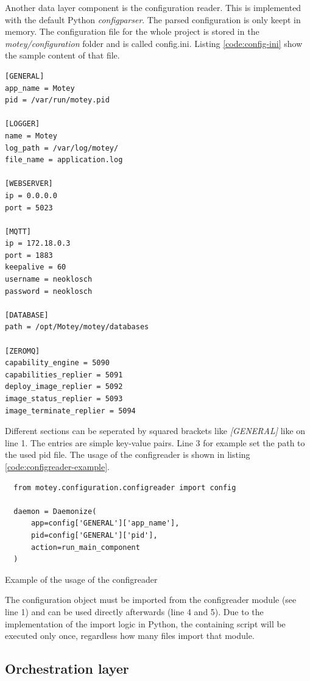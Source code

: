 Another data layer component is the configuration reader.
This is implemented with the default Python \textit{configparser}.
The parsed configuration is only keept in memory.
The configuration file for the whole project is stored in the \textit{motey/configuration} folder and is called config.ini.
Listing \ref{code:config-ini} show the sample content of that file.
\begin{verbatim}
[GENERAL]
app_name = Motey
pid = /var/run/motey.pid

[LOGGER]
name = Motey
log_path = /var/log/motey/
file_name = application.log

[WEBSERVER]
ip = 0.0.0.0
port = 5023

[MQTT]
ip = 172.18.0.3
port = 1883
keepalive = 60
username = neoklosch
password = neoklosch

[DATABASE]
path = /opt/Motey/motey/databases

[ZEROMQ]
capability_engine = 5090
capabilities_replier = 5091
deploy_image_replier = 5092
image_status_replier = 5093
image_terminate_replier = 5094
\end{verbatim}
\vspace{0.5cm}
Different sections can be seperated by squared brackets like \textit{[GENERAL]} like on line 1.
The entries are simple key-value pairs.
Line 3 for example set the path to the used pid file.
The usage of the configreader is shown in listing \ref{code:configreader-example}.

\begin{listing}[H]
  \begin{verbatim}
  from motey.configuration.configreader import config

  daemon = Daemonize(
      app=config['GENERAL']['app_name'],
      pid=config['GENERAL']['pid'],
      action=run_main_component
  )
  \end{verbatim}
  \caption{Example of the usage of the configreader}
  \label{code:configreader-example}
\end{listing}
The configuration object must be imported from the configreader module (see line 1) and can be used directly afterwards (line 4 and 5).
Due to the implementation of the import logic in Python, the containing script will be executed only once, regardless how many files import that module.

\subsection{Orchestration layer}
\doit


